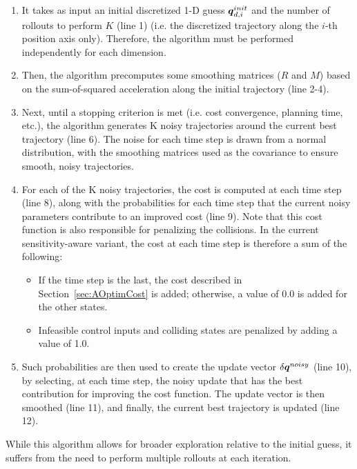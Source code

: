 \begin{enumerate}
    \item It takes as input an initial discretized 1-D guess $\boldsymbol{q}_{d,i}^{init}$ and the number of rollouts to perform $K$ (line 1) (i.e. the discretized trajectory along the $i$-th position axis only). 
    Therefore, the algorithm must be performed independently for each dimension. 
    \item Then, the algorithm precomputes some smoothing matrices ($R$ and $M$) based on the sum-of-squared acceleration along the initial trajectory (line 2-4).
    \item Next, until a stopping criterion is met (i.e. cost convergence, planning time, etc.), the algorithm generates K noisy trajectories around the current best trajectory (line 6).
    The noise for each time step is drawn from a normal distribution, with the smoothing matrices used as the covariance to ensure smooth, noisy trajectories.
    \item For each of the K noisy trajectories, the cost is computed at each time step (line 8), along with the probabilities for each time step that the current noisy parameters contribute to an improved cost (line 9).
    Note that this cost function is also responsible for penalizing the collisions.
    In the current sensitivity-aware variant, the cost at each time step is therefore a sum of the following:
    \begin{itemize}
        \item If the time step is the last, the cost described in Section~\ref{sec:AOptimCost} is added; otherwise, a value of 0.0 is added for the other states.
        \item Infeasible control inputs and colliding states are penalized by adding a value of 1.0.
    \end{itemize}
    \item Such probabilities are then used to create the update vector $\delta \boldsymbol{q}^{noisy}$ (line 10), by selecting, at each time step, the noisy update that has the best contribution for improving the cost function.
    The update vector is then smoothed (line 11), and finally, the current best trajectory is updated (line 12).
\end{enumerate}

While this algorithm allows for broader exploration relative to the initial guess, it suffers from the need to perform multiple rollouts at each iteration.

